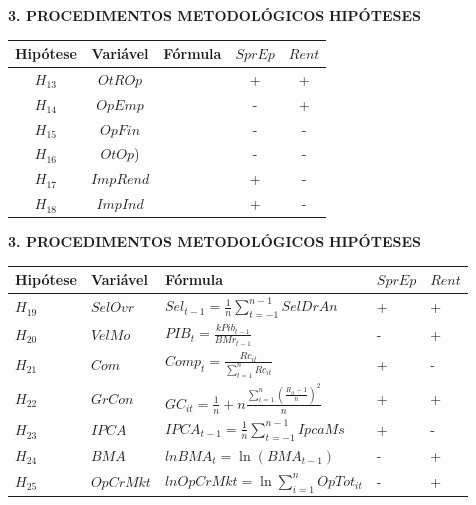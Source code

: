 \documentclass[
  ignorenonframetext,
  aspectratio=169,
  ignorenonframetext]{beamer}
\begin{document}
\begin{frame}{\textbf{3. PROCEDIMENTOS METODOLÓGICOS}}
\protect\hypertarget{procedimentos-metodoluxf3gicos-19}{}
\textbf{HIPÓTESES}

\begin{longtable}[]{@{}ccccc@{}}
\toprule
Hipótese & Variável & Fórmula & \(SprEp\) & \(Rent\) \\
\midrule
\endhead
\(H_{13}\) & \(OtROp\) & & + & + \\
\(H_{14}\) & \(OpEmp\) & & - & + \\
\(H_{15}\) & \(OpFin\) & & - & - \\
\(H_{16}\) & \(OtOp\)) & & - & - \\
\(H_{17}\) & \(ImpRend\) & & + & - \\
\(H_{18}\) & \(ImpInd\) & & + & - \\
\bottomrule
\end{longtable}
\end{frame}

\begin{frame}{\textbf{3. PROCEDIMENTOS METODOLÓGICOS}}
\protect\hypertarget{procedimentos-metodoluxf3gicos-20}{}
\textbf{HIPÓTESES}

\begin{longtable}[]{@{}
  >{\centering\arraybackslash}p{}
  >{\centering\arraybackslash}p{}
  >{\centering\arraybackslash}p{}
  >{\centering\arraybackslash}p{}
  >{\centering\arraybackslash}p{}@{}}
\toprule
Hipótese & Variável & Fórmula & \(SprEp\) & \(Rent\) \\
\midrule
\endhead
\(H_{19}\) & \(SelOvr\) &
\(Sel_{t-1} = \frac{1}{n}\sum_{t=-1}^{n-1}SelDrAn\) & + & + \\
\(H_{20}\) & \(VelMo\) & \(PIB_{t} = \frac{k Pib_{t-1}}{BMr_{t-1}}\) & -
& + \\
\(H_{21}\) & \(Com\) &
\(Comp_{t} = \frac{Rc_{it}}{\sum_{t=1}^{n}Rc_{it}}\) & + & - \\
\(H_{22}\) & \(GrCon\) &
\(GC_{it} = \frac{1}{n} + n\frac{\sum_{i=1}^{n}(\frac{R_{it} - 1}{n})^2}{n}\)
& + & + \\
\(H_{23}\) & \(IPCA\) &
\(IPCA_{t-1} = \frac{1}{n}\sum_{t=-1}^{n-1}IpcaMs\) & + & - \\
\(H_{24}\) & \(BMA\) & \(lnBMA_{t} = \ln(BMA_{t-1})\) & - & + \\
\(H_{25}\) & \(OpCrMkt\) & \(lnOpCrMkt = \ln\sum_{i = 1}^nOpTot_{it}\) &
- & + \\
\bottomrule
\end{longtable}
\end{frame}
\end{document}
